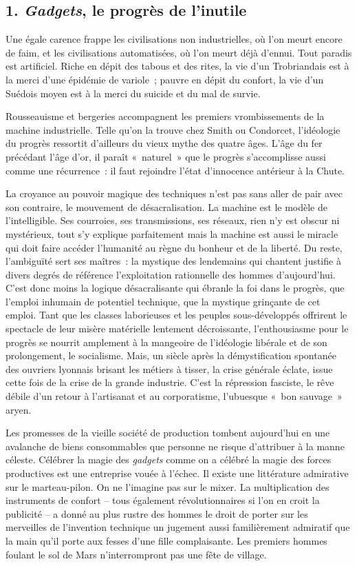 \documentclass[french,twoside]{book} %
\begin{document}
\subsection[{1. Gadgets, le progrès de l’inutile}]{\textsc{1.} \emph{Gadgets}, le progrès de l’inutile}
\noindent Une égale carence frappe les civilisations non industrielles, où l’on meurt encore de faim, et les civilisations automatisées, où l’on meurt déjà d’ennui. Tout paradis est artificiel. Riche en dépit des tabous et des rites, la vie d’un Trobriandais est à la merci d’une épidémie de variole ; pauvre en dépit du confort, la vie d’un Suédois moyen est à la merci du suicide et du mal de survie.\par
Rousseauisme et bergeries accompagnent les premiers vrombissements de la machine industrielle. Telle qu’on la trouve chez Smith ou Condorcet, l’idéologie du progrès ressortit d’ailleurs du vieux mythe des quatre âges. L’âge du fer précédant l’âge d’or, il paraît « naturel » que le progrès s’accomplisse aussi comme une récurrence : il faut rejoindre l’état d’innocence antérieur à la Chute.\par
La croyance au pouvoir magique des techniques n’est pas sans aller de pair avec son contraire, le mouvement de désacralisation. La machine est le modèle de l’intelligible. Ses courroies, ses transmissions, ses réseaux, rien n’y est obscur ni mystérieux, tout s’y explique parfaitement mais la machine est aussi le miracle qui doit faire accéder l’humanité au règne du bonheur et de la liberté. Du reste, l’ambiguïté sert ses maîtres : la mystique des lendemains qui chantent justifie à divers degrés de référence l’exploitation rationnelle des hommes d’aujourd’hui. C’est donc moins la logique désacralisante qui ébranle la foi dans le progrès, que l’emploi inhumain de potentiel technique, que la mystique grinçante de cet emploi. Tant que les classes laborieuses et les peuples sous-développés offrirent le spectacle de leur misère matérielle lentement décroissante, l’enthousiasme pour le progrès se nourrit amplement à la mangeoire de l’idéologie libérale et de son prolongement, le socialisme. Mais, un siècle après la démystification spontanée des ouvriers lyonnais brisant les métiers à tisser, la crise générale éclate, issue cette fois de la crise de la grande industrie. C’est la répression fasciste, le rêve débile d’un retour à l’artisanat et au corporatisme, l’ubuesque « bon sauvage » aryen.\par
Les promesses de la vieille société de production tombent aujourd’hui en une avalanche de biens consommables que personne ne risque d’attribuer à la manne céleste. Célébrer la magie des \emph{gadgets} comme on a célébré la magie des forces productives est une entreprise vouée à l’échec. Il existe une littérature admirative sur le marteau-pilon. On ne l’imagine pas sur le mixer. La multiplication des instruments de confort – tous également révolutionnaires si l’on en croit la publicité – a donné au plus rustre des hommes le droit de porter sur les merveilles de l’invention technique un jugement aussi familièrement admiratif que la main qu’il porte aux fesses d’une fille complaisante. Les premiers hommes foulant le sol de Mars n’interrompront pas une fête de village.\par
\end{document}
